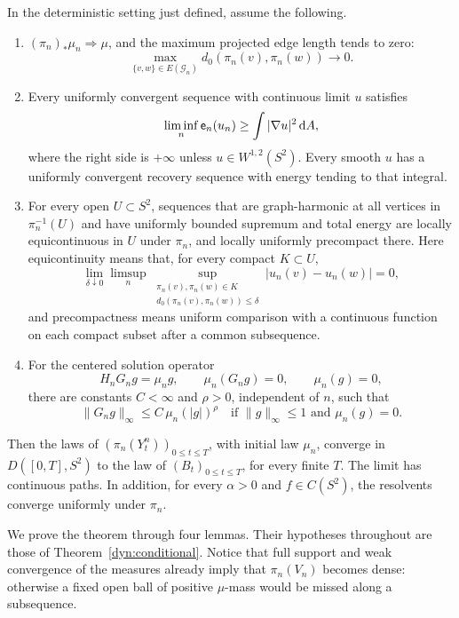\begin{theorem}
\label{dyn:conditional}
In the deterministic setting just defined, assume the following.
\begin{enumerate}[label=\textup{(\roman*)}]
\item $(\pi_n)_*\mu_n\Rightarrow\mu$, and the maximum projected
edge length tends to zero:
\[
 \max_{\{v,w\}\in E(\mathcal G_n)}d_0(\pi_n(v),\pi_n(w))\longrightarrow0.
\]
\item Every uniformly convergent sequence with continuous limit $u$
satisfies
\[
 \liminf_n\mathsf e_n(u_n)\ge\int|\nabla u|^2\,\mathrm d A,
\]
where the right side is $+\infty$ unless $u\in W^{1,2}(S^2)$.
Every smooth $u$ has a uniformly convergent recovery sequence with
energy tending to that integral.
\item For every open $U\subset S^2$, sequences that are graph-harmonic
at all vertices in $\pi_n^{-1}(U)$ and have uniformly bounded
supremum and total energy are locally equicontinuous in $U$ under
$\pi_n$, and locally uniformly precompact there.
Here equicontinuity means that, for every compact $K\subset U$,
\[
 \lim_{\delta\downarrow0}\limsup_n
 \sup_{\substack{\pi_n(v),\pi_n(w)\in K\\
                  d_0(\pi_n(v),\pi_n(w))\le\delta}}
       |u_n(v)-u_n(w)|=0,
\]
and precompactness means uniform comparison with a continuous
function on each compact subset after a common subsequence.
\item For the centered solution operator
\[
 H_nG_ng=\mu_n g,\qquad \mu_n(G_ng)=0,
 \qquad \mu_n(g)=0,
\]
there are constants $C<\infty$ and $\rho>0$, independent of $n$, such
that
\begin{equation}\label{dyn:green-assumption}
 \|G_ng\|_\infty\le C\,\mu_n(|g|)^\rho
 \quad\text{if }\|g\|_\infty\le1\text{ and }\mu_n(g)=0.
\end{equation}
\end{enumerate}
Then the laws of $(\pi_n(Y^n_t))_{0\le t\le T}$, with initial law
$\mu_n$, converge in $D([0,T],S^2)$ to the law of
$(B_t)_{0\le t\le T}$, for every finite $T$.  The limit has continuous
paths.  In addition, for every $\alpha>0$ and $f\in C(S^2)$, the
resolvents converge uniformly under $\pi_n$.
\end{theorem}

We prove the theorem through four lemmas.  Their hypotheses throughout
are those of Theorem~\ref{dyn:conditional}.  Notice that full support
and weak convergence of the measures already imply that $\pi_n(V_n)$
becomes dense: otherwise a fixed open ball of positive $\mu$-mass
would be missed along a subsequence.

